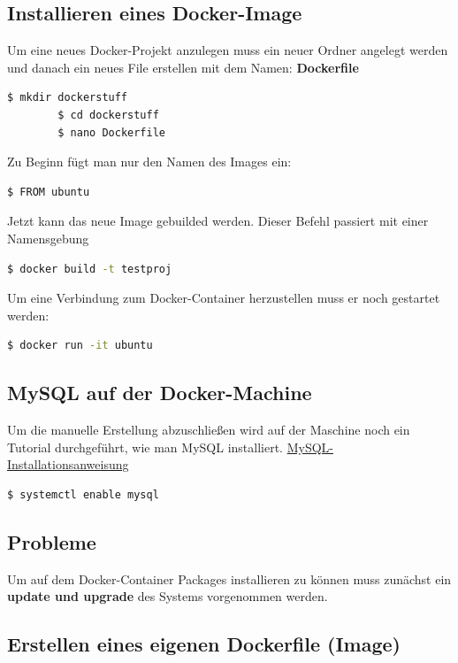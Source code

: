 	\subsection{Installieren eines Docker-Image}
		Um eine neues Docker-Projekt anzulegen  muss ein neuer Ordner angelegt werden und danach ein neues File erstellen mit dem Namen: \textbf{Dockerfile}
		\begin{lstlisting}[language=bash,caption={Erstellen des Docker-Project root}]
		$ mkdir dockerstuff
		$ cd dockerstuff
		$ nano Dockerfile
		\end{lstlisting}
		Zu Beginn fügt man nur den Namen des Images ein:
		\begin{lstlisting}[language=bash,caption={Dockerfile erster Eintrag}]
		$ FROM ubuntu
		\end{lstlisting}
		Jetzt kann das neue Image gebuilded werden. Dieser Befehl passiert mit einer Namensgebung
		\begin{lstlisting}[language=bash,caption={Builden des Images}]
		$ docker build -t testproj
		\end{lstlisting}
		Um eine Verbindung zum Docker-Container herzustellen muss er noch gestartet werden:
		\begin{lstlisting}[language=bash,caption={Starten des Containers}]
		$ docker run -it ubuntu
		\end{lstlisting}
	
	\subsection{MySQL auf der Docker-Machine}
		Um die manuelle Erstellung abzuschließen wird auf der Maschine noch ein Tutorial durchgeführt, wie man MySQL installiert.
		\href{https://www.digitalocean.com/community/tutorials/how-to-install-mysql-on-ubuntu-14-04}{MySQL-Installationsanweisung}
		
		\begin{lstlisting}[language=bash,caption={MySQL beim Start ausführen}]
		$ systemctl enable mysql
		\end{lstlisting}
	\subsection{Probleme}
	Um auf dem Docker-Container Packages installieren zu können muss zunächst ein \textbf{update und upgrade} des Systems vorgenommen werden.

	\subsection{Erstellen eines eigenen Dockerfile (Image)}
